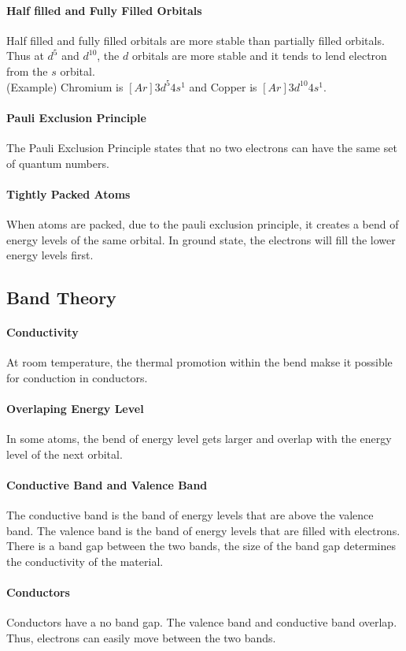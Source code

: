 \documentclass[11pt]{report}
\begin{document}
\paragraph{Half filled and Fully Filled Orbitals} Half filled and fully filled orbitals are more stable than partially filled orbitals. Thus at $d^5$ and $d^{10}$, the $d$ orbitals are more stable and it tends to lend electron from the $s$ orbital.\\
(Example) Chromium is $[Ar] 3d^5 4s^1$ and Copper is $[Ar] 3d^{10} 4s^1$.
\paragraph{Pauli Exclusion Principle} The Pauli Exclusion Principle states that no two electrons can have the same set of quantum numbers. 
\paragraph{Tightly Packed Atoms} When atoms are packed, due to the pauli exclusion principle, it creates a bend of energy levels of the same orbital. In ground state, the electrons will fill the lower energy levels first.
\subsection{Band Theory}
\paragraph{Conductivity} At room temperature, the thermal promotion within the bend makse it possible for conduction in conductors.
\paragraph{Overlaping Energy Level} In some atoms, the bend of energy level gets larger and overlap with the energy level of the next orbital. 
\paragraph{Conductive Band and Valence Band} The conductive band is the band of energy levels that are above the valence band. The valence band is the band of energy levels that are filled with electrons. There is a band gap between the two bands, the size of the band gap determines the conductivity of the material.
\paragraph{Conductors} Conductors have a no band gap. The valence band and conductive band overlap. Thus, electrons can easily move between the two bands.
\end{document}
